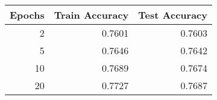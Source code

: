 \begin{tabular}{|r||r|r|}
\hline
Epochs & Train Accuracy & Test Accuracy \\
\hline
2 & 0.7601 & 0.7603 \\
5 & 0.7646 & 0.7642 \\
10 & 0.7689 & 0.7674 \\
20 & 0.7727 & 0.7687 \\
\hline
\end{tabular}
